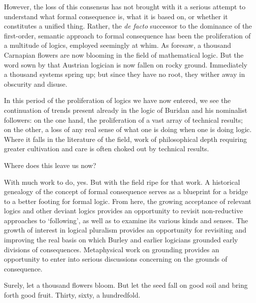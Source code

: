 However, the loss of this consensus has not brought with it a serious attempt to understand what formal consequence is, what it is based on, or whether it constitutes a unified thing. Rather, the \textit{de facto} successor to the dominance of the first-order, semantic approach to formal consequence has been the proliferation of a multitude of logics, employed seemingly at whim. As \cite{Mehlberg1960} foresaw, a thousand Carnapian flowers are now blooming in the field of mathematical logic. But the word sown by that Austrian logician is now fallen on rocky ground. Immediately a thousand systems spring up; but since they have no root, they wither away in obscurity and disuse. 

In this period of the proliferation of logics we have now entered, we see the continuation of trends present already in the logic of Buridan and his nominalist followers: on the one hand, the proliferation of a vast array of technical results; on the other, a loss of any real sense of what one is doing when one is doing logic. Where it falls in the literature of the field, work of philosophical depth requiring greater cultivation and care is often choked out by technical results.

Where does this leave us now? 

With much work to do, yes. But with the field ripe for that work. A historical genealogy of the concept of formal consequence serves as a blueprint for a bridge to a better footing for formal logic. From here, the growing acceptance of relevant logics and other deviant logics provides an opportunity to revisit non-reductive approaches to `following', as well as to examine its various kinds and senses. The growth of interest in logical pluralism provides an opportunity for revisiting and improving the real basis on which Burley and earlier logicians grounded early divisions of consequences. Metaphysical work on grounding provides an opportunity to enter into serious discussions concerning on the grounds of consequence.

Surely, let a thousand flowers bloom. But let the seed fall on good soil and bring forth good fruit. Thirty, sixty, a hundredfold.


